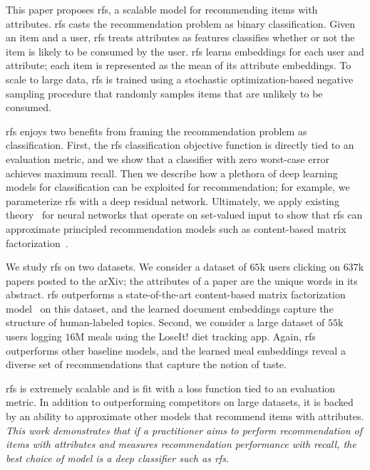 This paper proposes \gls{rfs}, a scalable model for recommending items with
attributes. \gls{rfs} casts the recommendation problem as binary classification.
Given an item and a user, \gls{rfs} treats attributes as features classifies
whether or not the item is likely to be consumed by the user. \gls{rfs} learns
embeddings for each user and attribute; each item is represented as the mean of
its attribute embeddings. To scale to large data, \gls{rfs} is trained using a
stochastic optimization-based negative sampling procedure that randomly samples
items that are unlikely to be consumed.

\gls{rfs} enjoys two benefits from framing the recommendation problem as
classification. First, the \gls{rfs} classification objective function is
directly tied to an evaluation metric, and we show that a classifier with zero
worst-case error achieves maximum recall. Then we describe how a plethora of
deep learning models for classification can be exploited for recommendation; for
example, we parameterize \gls{rfs} with a deep residual network. Ultimately, we
apply existing theory~\cite{zaheer2017deep} for neural networks that operate on
set-valued input to show that \gls{rfs} can approximate principled
recommendation models such as content-based matrix
factorization~\cite{gopalan2014content-based}.

We study \gls{rfs} on two datasets. We consider a dataset of $65$k users
clicking on $637$k papers posted to the arXiv; the attributes of a paper are the
unique words in its abstract. \gls{rfs} outperforms a state-of-the-art
content-based matrix factorization model~\cite{gopalan2014content-based} on this
dataset, and the learned document embeddings capture the structure of
human-labeled topics. Second, we consider a large dataset of $55$k users logging
$16$M meals using the LoseIt! diet tracking app. Again, \gls{rfs} outperforms
other baseline models, and the learned meal embeddings reveal a diverse set of
recommendations that capture the notion of taste.

\gls{rfs} is extremely scalable and is fit with a loss function tied to an
evaluation metric. In addition to outperforming competitors on large datasets,
it is backed by an ability to approximate other models that recommend items with
attributes. \emph{This work demonstrates that if a practitioner aims to perform
  recommendation of items with attributes and measures recommendation
  performance with recall, the best choice of model is a deep classifier such as
  \gls{rfs}.}


